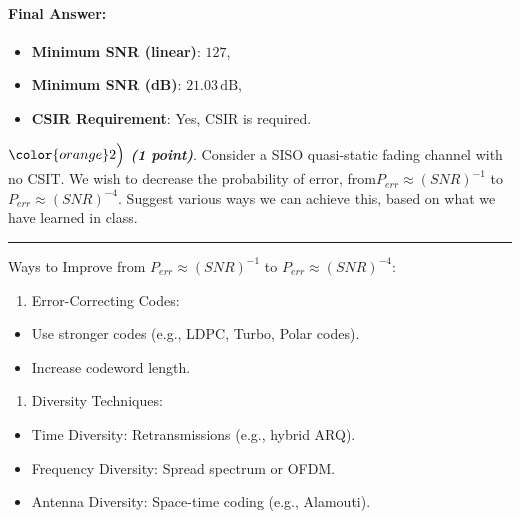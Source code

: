 \documentclass[11pt]{article}
\providecommand{\tightlist}{%
      \setlength{\itemsep}{0pt}\setlength{\parskip}{0pt}}
\begin{document}
\paragraph{Final Answer:}\label{final-answer}

\begin{itemize}
\tightlist
\item
  \textbf{Minimum SNR (linear)}: \(127\),
\item
  \textbf{Minimum SNR (dB)}: \(21.03 \, \text{dB}\),
\item
  \textbf{CSIR Requirement}: Yes, CSIR is required.
\end{itemize}

    \(\color{orange}2\Bigl)\) \textbf{\emph{(1 point)}}. Consider a SISO
quasi-static fading channel with no CSIT. We wish to decrease the
probability of error, from\(P_{err} \approx (SNR)^{−1}\) to
\(P_{err} \approx (SNR)^{−4}\). Suggest various ways we can achieve
this, based on what we have learned in class.

    \begin{center}\rule{0.5\linewidth}{0.5pt}\end{center}

Ways to Improve from \(P_{err} \approx (SNR)^{−1}\) to
\(P_{err} \approx (SNR)^{−4}\):

\begin{enumerate}
\def\labelenumi{\arabic{enumi}.}
\tightlist
\item
  Error-Correcting Codes:
\end{enumerate}

\begin{itemize}
\tightlist
\item
  Use stronger codes (e.g., LDPC, Turbo, Polar codes).
\item
  Increase codeword length.
\end{itemize}

\begin{enumerate}
\def\labelenumi{\arabic{enumi}.}
\setcounter{enumi}{1}
\tightlist
\item
  Diversity Techniques:
\end{enumerate}

\begin{itemize}
\tightlist
\item
  Time Diversity: Retransmissions (e.g., hybrid ARQ).
\item
  Frequency Diversity: Spread spectrum or OFDM.
\item
  Antenna Diversity: Space-time coding (e.g., Alamouti).
\end{itemize}
\end{document}
